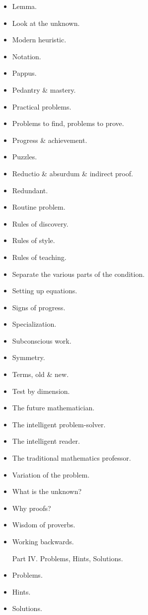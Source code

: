 \documentclass{article}
\begin{document}
\begin{enumerate}
\begin{itemize}
		\item {\sf Lemma.}
		\item {\sf Look at the unknown.}
		\item {\sf Modern heuristic.}
		\item {\sf Notation.}
		\item {\sf Pappus.}
		\item {\sf Pedantry \& mastery.}
		\item {\sf Practical problems.}
		\item {\sf Problems to find, problems to prove.}
		\item {\sf Progress \& achievement.}
		\item {\sf Puzzles.}
		\item {\sf Reductio \& absurdum \& indirect proof.}
		\item {\sf Redundant.}
		\item {\sf Routine problem.}
		\item {\sf Rules of discovery.}
		\item {\sf Rules of style.}
		\item {\sf Rules of teaching.}
		\item {\sf Separate the various parts of the condition.}
		\item {\sf Setting up equations.}
		\item {\sf Signs of progress.}
		\item {\sf Specialization.}
		\item {\sf Subconscious work.}
		\item {\sf Symmetry.}
		\item {\sf Terms, old \& new.}
		\item {\sf Test by dimension.}
		\item {\sf The future mathematician.}
		\item {\sf The intelligent problem-solver.}
		\item {\sf The intelligent reader.}
		\item {\sf The traditional mathematics professor.}
		\item {\sf Variation of the problem.}
		\item {\sf What is the unknown?}
		\item {\sf Why proofs?}
		\item {\sf Wisdom of proverbs.}
		\item {\sf Working backwards.}
		
		Part IV. Problems, Hints, Solutions.
		\item {\sf Problems.}
		\item {\sf Hints.}
		\item {\sf Solutions.}
	\end{itemize}
		

\end{enumerate}
\end{document}
